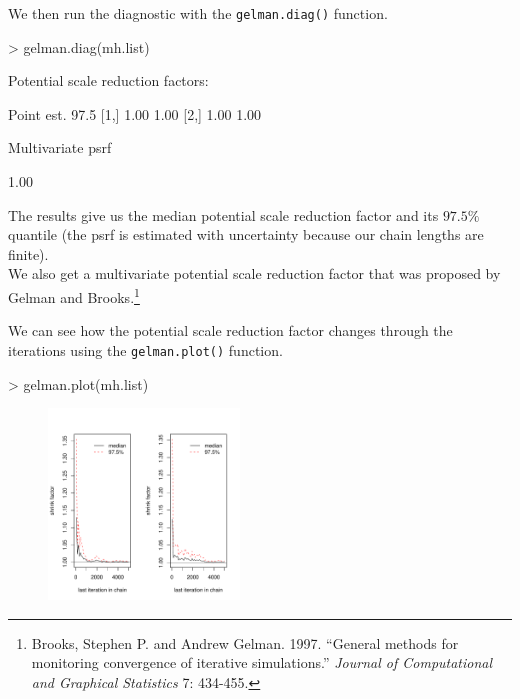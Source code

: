 \documentclass{beamer}
\begin{document}
\begin{frame}[fragile]
We then run the diagnostic with the {\tt gelman.diag()} function.
\pause
\medskip
\tiny
\begin{Schunk}
\begin{Sinput}
> gelman.diag(mh.list)
\end{Sinput}
\begin{Soutput}
Potential scale reduction factors:

     Point est. 97.5%
[1,]       1.00           1.00
[2,]       1.00           1.00

Multivariate psrf

1.00
\end{Soutput}
\end{Schunk}
\normalsize
\bigskip
\pause
The results give us the median potential scale reduction factor and
its $97.5\%$ quantile (the psrf is estimated with uncertainty because
our chain lengths are finite).  \\
\bigskip
\pause
We also get a multivariate potential scale reduction factor that was
proposed by Gelman and Brooks.\footnote{\tiny Brooks, Stephen P. and
Andrew Gelman. 1997. ``General methods for monitoring convergence of iterative simulations.'' \textit{Journal of Computational and Graphical Statistics} 7: 434-455. }
\end{frame}

\begin{frame}[fragile]
\normalsize
We can see how the potential scale reduction factor changes through
the iterations using the {\tt gelman.plot()} function.
\pause
\medskip
\tiny
\begin{Schunk}
\begin{Sinput}
> gelman.plot(mh.list)
\end{Sinput}
\end{Schunk}
\begin{figure}[!htp]
\begin{center}
\includegraphics[width=2in, height=2in]{convergence-gelman.pdf}
\end{center}
\end{figure}
\normalsize
\end{frame}
\end{document}
